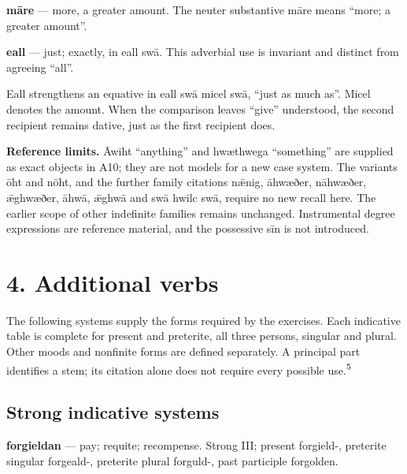 \textbf{māre} — more, a greater amount. The neuter substantive māre means “more; a greater amount”.

\textbf{eall} — just; exactly, in eall swā. This adverbial use is invariant and distinct from agreeing “all”.

Eall strengthens an equative in eall swā micel swā, “just as much as”. Micel denotes the amount. When the comparison leaves “give” understood, the second recipient remains dative, just as the first recipient does.

\textbf{Reference limits.} Āwiht “anything” and hwæthwega “something” are supplied as exact objects in A10; they are not models for a new case system. The variants ōht and nōht, and the further family citations nǣnig, āhwæðer, nāhwæðer, ǣghwæðer, āhwā, ǣghwā and swā hwilc swā, require no new recall here. The earlier scope of other indefinite families remains unchanged. Instrumental degree expressions are reference material, and the possessive sīn is not introduced.

\section*{4. Additional verbs}

The following systems supply the forms required by the exercises. Each indicative table is complete for present and preterite, all three persons, singular and plural. Other moods and nonfinite forms are defined separately. A principal part identifies a stem; its citation alone does not require every possible use.\textsuperscript{5}

\subsection*{Strong indicative systems}

\textbf{forgieldan} — pay; requite; recompense. Strong III; present forgield-, preterite singular forgeald-, preterite plural forguld-, past participle forgolden.


